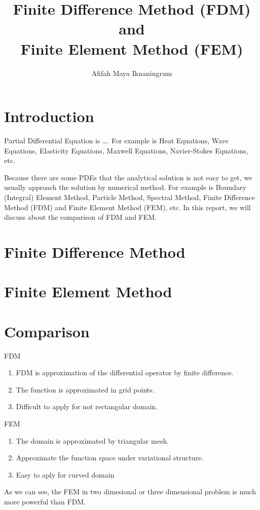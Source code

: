 \documentclass[]{report}
\title{Finite Difference Method (FDM) and \\Finite Element Method (FEM)}
\author{Afifah Maya Iknaningrum}
\begin{document}
\maketitle

\section{Introduction}
Partial Differential Equation is \dots . For example is Heat Equations, Wave Equations, Elasticity Equations, Maxwell Equations, Navier-Stokes Equations, etc.

Because there are some PDEs that the analytical solution is not easy to get, we usually approach the solution by numerical method. For example is Boundary (Integral) Element Method, Particle Method, Spectral Method, Finite Difference Method (FDM) and Finite Element Method (FEM), etc. In this report, we will discuss about the comparison of FDM and FEM.

\section{Finite Difference Method}

\section{Finite Element Method}

\section{Comparison}

FDM
\begin{enumerate}
	\item FDM is approximation of the differential operator by finite difference.
	\item The function is approximated in grid points.
	\item Difficult to apply for not rectangular domain.
\end{enumerate}

FEM
\begin{enumerate}
	\item The domain is approximated by triangular mesh.
	\item Approximate the function space under variational structure.
	\item Easy to aply for curved domain
\end{enumerate}

As we can see, the FEM in two dimesional  or three dimensional problem is much more powerful than FDM.
\end{document}
